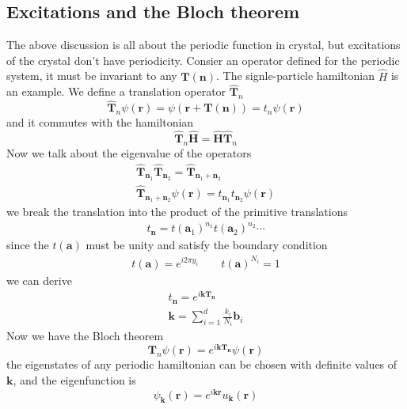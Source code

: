 \documentclass[11pt]{article}
\begin{document}
\subsection{Excitations and the Bloch theorem}
The above discussion is all about the periodic function in crystal, but excitations of the crystal don't have periodicity.
Consier an operator defined for the periodic system, it must be invariant to any $\mathbf{T(n)}$. The signle-particle hamiltonian
$\hat{H}$ is an example. We define a translation operator $\hat{\mathbf{T}}_n$
\begin{equation}
    \hat{\mathbf{T}}_n\psi(\mathbf{r})=\psi(\mathbf{r+T(n)})=t_n\psi(\mathbf{r})
\end{equation}
and it commutes with the hamiltonian
\begin{equation}
    \hat{\mathbf{T}}_n\hat{\mathbf{H}}=\hat{\mathbf{H}}\hat{\mathbf{T}}_n
\end{equation}
Now we talk about the eigenvalue of the operators
\begin{gather}
    \hat{\mathbf{T}}_{\mathbf{n}_1}\hat{\mathbf{T}}_{\mathbf{n}_2}=\hat{\mathbf{T}}_{\mathbf{n}_1+\mathbf{n}_2}\\
    \hat{\mathbf{T}}_{\mathbf{n}_1+\mathbf{n}_2}\psi(\mathbf{r})=t_{\mathbf{n}_1}t_{\mathbf{n}_2}\psi(\mathbf{r})
\end{gather} 
we break the translation into the product of the primitive translations
\begin{gather}
    t_{\mathbf{n}}={t(\mathbf{a}_1)}^{n_1}{t(\mathbf{a}_2)}^{n_2}\cdots
\end{gather} 
since the $t(\mathbf{a})$ must be unity and satisfy the boundary condition
\begin{gather}
    t(\mathbf{a})=e^{i2\pi y_i} \qquad {t(\mathbf{a})}^{N_i}=1
\end{gather}
we can derive
\begin{gather}
    t_{\mathbf{n}}=e^{i\mathbf{kT_n}}\\
    \mathbf{k}=\sum_{i=1}^{d}\frac{k_i}{N_i}\mathbf{b}_i
\end{gather}
Now we have the Bloch theorem
\begin{equation}
    {\mathbf{T}}_n\psi(\mathbf{r})=e^{i\mathbf{kT_n}}\psi(\mathbf{r})
\end{equation}
the eigenstates of any periodic hamiltonian can be chosen with definite values of $\mathbf{k}$, and the eigenfunction is
\begin{equation}
    \psi_{\mathbf{k}}(\mathbf{r})=e^{i\mathbf{kr}}u_{\mathbf{k}}(\mathbf{r})
\end{equation}
\end{document}
